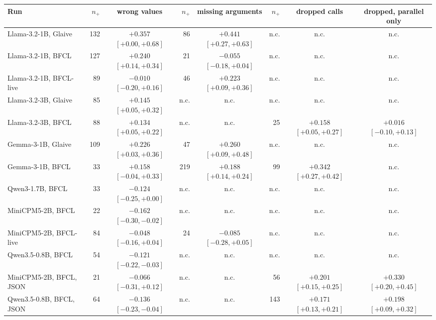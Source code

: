 \begin{tabular}{@{}lrcrcrcc@{}}
\toprule
Run & $n_+$ & wrong values & $n_+$ & missing arguments & $n_+$ & dropped calls & dropped, parallel only \\
\midrule
Llama-3.2-1B, Glaive & 132 & $+0.357$ {\scriptsize$[+0.00, +0.68]$} & 86 & $+0.441$ {\scriptsize$[+0.27, +0.63]$} & n.c. & n.c. & n.c. \\
Llama-3.2-1B, BFCL & 127 & $+0.240$ {\scriptsize$[+0.14, +0.34]$} & 21 & $-0.055$ {\scriptsize$[-0.18, +0.04]$} & n.c. & n.c. & n.c. \\
Llama-3.2-1B, BFCL-live & 89 & $-0.010$ {\scriptsize$[-0.20, +0.16]$} & 46 & $+0.223$ {\scriptsize$[+0.09, +0.36]$} & n.c. & n.c. & n.c. \\
Llama-3.2-3B, Glaive & 85 & $+0.145$ {\scriptsize$[+0.05, +0.32]$} & n.c. & n.c. & n.c. & n.c. & n.c. \\
Llama-3.2-3B, BFCL & 88 & $+0.134$ {\scriptsize$[+0.05, +0.22]$} & n.c. & n.c. & 25 & $+0.158$ {\scriptsize$[+0.05, +0.27]$} & $+0.016$ {\scriptsize$[-0.10, +0.13]$} \\
Gemma-3-1B, Glaive & 109 & $+0.226$ {\scriptsize$[+0.03, +0.36]$} & 47 & $+0.260$ {\scriptsize$[+0.09, +0.48]$} & n.c. & n.c. & n.c. \\
Gemma-3-1B, BFCL & 33 & $+0.158$ {\scriptsize$[-0.04, +0.33]$} & 219 & $+0.188$ {\scriptsize$[+0.14, +0.24]$} & 99 & $+0.342$ {\scriptsize$[+0.27, +0.42]$} & n.c. \\
Qwen3-1.7B, BFCL & 33 & $-0.124$ {\scriptsize$[-0.25, +0.00]$} & n.c. & n.c. & n.c. & n.c. & n.c. \\
MiniCPM5-2B, BFCL & 22 & $-0.162$ {\scriptsize$[-0.30, -0.02]$} & n.c. & n.c. & n.c. & n.c. & n.c. \\
MiniCPM5-2B, BFCL-live & 84 & $-0.048$ {\scriptsize$[-0.16, +0.04]$} & 24 & $-0.085$ {\scriptsize$[-0.28, +0.05]$} & n.c. & n.c. & n.c. \\
Qwen3.5-0.8B, BFCL & 54 & $-0.121$ {\scriptsize$[-0.22, -0.03]$} & n.c. & n.c. & n.c. & n.c. & n.c. \\
MiniCPM5-2B, BFCL, JSON & 21 & $-0.066$ {\scriptsize$[-0.31, +0.12]$} & n.c. & n.c. & 56 & $+0.201$ {\scriptsize$[+0.15, +0.25]$} & $+0.330$ {\scriptsize$[+0.20, +0.45]$} \\
Qwen3.5-0.8B, BFCL, JSON & 64 & $-0.136$ {\scriptsize$[-0.23, -0.04]$} & n.c. & n.c. & 143 & $+0.171$ {\scriptsize$[+0.13, +0.21]$} & $+0.198$ {\scriptsize$[+0.09, +0.32]$} \\
\bottomrule
\end{tabular}
